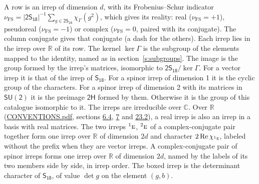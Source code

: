\documentclass[10pt,a4paper]{article}
\numberwithin{equation}{section}
\newcommand{\grp}[1]{\mathsf{#1}}
\newcommand{\irr}[1]{\text{\normalfont\scshape #1}}
\newcommand{\conjpair}[1]{{}^{#1}}
\newcommand{\irchar}[1]{\chi_{#1}}
\newcommand{\fsind}{\nu_{\mathrm{FS}}}
\begin{document}
\leavevmode\label{n:index.frobenius}\label{n:head.irrep}\label{n:head.reality}A row is an irrep of dimension $d$, with its Frobenius--Schur indicator $\fsind = |\grp{2S_{18}}|^{-1}\allowbreak\sum_{g\in\grp{2S_{18}}}\irchar{\Gamma}(g^2)$, which gives its reality: real ($\fsind = +1$), pseudoreal ($\fsind = -1$) or complex ($\fsind = 0$, paired with its conjugate). \label{n:head.conjugate}The column conjugate gives that conjugate (a dash for the others). \label{n:head.over.real}Each irrep lies in the irrep over $\mathbb{R}$ of its row. \label{n:head.kernel}The kernel $\ker\Gamma$ is the subgroup of the elements mapped to the identity, named as in section~\ref{s:subgroups}. \label{n:head.image}The image is the group formed by the irrep's matrices, isomorphic to $\grp{2S_{18}}/\ker\Gamma$. For a vector irrep it is that of the irrep of \href{../../../rotation/data/pdf/S18.pdf}{$\grp{S_{18}}$}. For a spinor irrep of dimension 1 it is the cyclic group of the characters. For a spinor irrep of dimension 2 with its matrices in $\grp{SU(2)}$ it is the preimage $\grp{2H}$ formed by them. Otherwise it is the group of this catalogue isomorphic to it. The irreps are irreducible over $\mathbb{C}$. Over $\mathbb{R}$ (\href{../../CONVENTIONS.pdf}{CONVENTIONS.pdf}, sections \href{../../../rotation/CONVENTIONS.pdf\#conv.6.4}{6.4}, \href{../../../rotation/CONVENTIONS.pdf\#conv.7}{7} and \href{../../CONVENTIONS.pdf\#conv.23.2}{23.2}), a real irrep is also an irrep in a basis with real matrices. The two irreps $\conjpair{1}\irr{e}$, $\conjpair{2}\irr{e}$ of a complex-conjugate pair together form one irrep over $\mathbb{R}$ of dimension $2d$ and character $2\operatorname{Re}\irchar{\conjpair{1}\irr{e}}$, labeled without the prefix when they are vector irreps. A complex-conjugate pair of spinor irreps forms one irrep over $\mathbb{R}$ of dimension $2d$, named by the labels of its two members side by side, in irrep order. \label{n:mark.determinant}The boxed irrep is the determinant character of \href{../../../rotation/data/pdf/S18.pdf}{$\grp{S_{18}}$}, of value $\det g$ on the element $(g, b)$.
\setlength{\emergencystretch}{2em}\par\setlength{\emergencystretch}{0pt}
\end{document}
